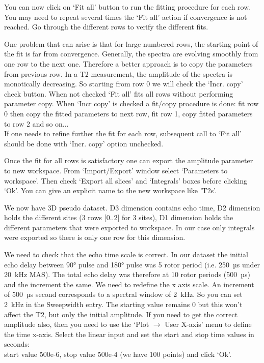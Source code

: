 \documentclass[11pt,a4paper]{article}
\begin{document}
You can now click on `Fit all' button to run the fitting procedure for each row. You may need to repeat several times the `Fit all' action if convergence is not reached.
Go through the different rows to verify the different fits.

One problem that can arise is that for large numbered rows, the starting point of the fit is far from convergence.
Generally, the spectra are evolving smoothly from one row to the next one. Therefore a better approach is to copy the parameters from previous row.
In a T2 measurement, the amplitude of the spectra is monotically decreasing. So starting from row 0 we will check the `Incr. copy' check button. 
When not checked `Fit all' fits all rows without performing parameter copy. When `Incr copy' is checked a fit/copy procedure is done: fit row 0 
then copy the fitted parameters to next row, fit row 1, copy fitted parameters to row 2 and so on...\\
If one needs to refine further the fit for each row, subsequent call to `Fit all' should be done with `Incr. copy' option unchecked.

Once the fit for all rows is satisfactory one can export the amplitude parameter to new workspace. From  `Import/Export' window select `Parameters to workspace'.
Then check `Export all slices' and `Integrals' boxes before clicking `Ok'. You can give an explicit name to the new workspace like 'T2s'.

We now have 3D pseudo dataset. D3 dimension contains echo time, D2 dimension holds the different sites (3 rows [0..2] for 3 sites), D1 dimension holds the 
different parameters that were exported to workspace. In our case only integrals were exported so there is only one row for this dimension.

We need to check that the echo time scale is correct. In our dataset the initial echo delay between 90° pulse and 180° pulse was 5 rotor period 
(i.e. 250~µs under 20~kHz MAS). The total echo delay was therefore at 10 rotor periods (500~µs) and the increment the same.
We need to redefine the x axis scale. An increment of 500~µs second corresponds to a spectral window of 2~kHz. So you can set 2~kHz in the Sweepwidth entry.
The starting value remains 0 but this won't affect the T2, but only the initial amplitude. If you need to get the correct amplitude also, then you need to 
use the `Plot $\rightarrow$ User X-axis' menu to define the time x-axis.
Select the linear input and set the start and stop time values in seconds:\\
start value 500e-6, stop value 500e-4 (we have 100 points) and click `Ok'.
\end{document}
